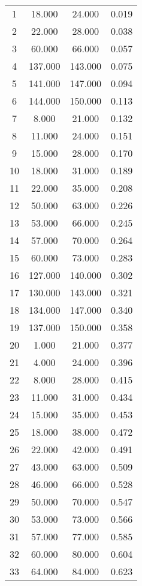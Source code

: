 % 
\begin{tabular}{cccc}
  \hline
  \hline
1 & 18.000 & 24.000 & 0.019 \\ 
  2 & 22.000 & 28.000 & 0.038 \\ 
  3 & 60.000 & 66.000 & 0.057 \\ 
  4 & 137.000 & 143.000 & 0.075 \\ 
  5 & 141.000 & 147.000 & 0.094 \\ 
  6 & 144.000 & 150.000 & 0.113 \\ 
  7 & 8.000 & 21.000 & 0.132 \\ 
  8 & 11.000 & 24.000 & 0.151 \\ 
  9 & 15.000 & 28.000 & 0.170 \\ 
  10 & 18.000 & 31.000 & 0.189 \\ 
  11 & 22.000 & 35.000 & 0.208 \\ 
  12 & 50.000 & 63.000 & 0.226 \\ 
  13 & 53.000 & 66.000 & 0.245 \\ 
  14 & 57.000 & 70.000 & 0.264 \\ 
  15 & 60.000 & 73.000 & 0.283 \\ 
  16 & 127.000 & 140.000 & 0.302 \\ 
  17 & 130.000 & 143.000 & 0.321 \\ 
  18 & 134.000 & 147.000 & 0.340 \\ 
  19 & 137.000 & 150.000 & 0.358 \\ 
  20 & 1.000 & 21.000 & 0.377 \\ 
  21 & 4.000 & 24.000 & 0.396 \\ 
  22 & 8.000 & 28.000 & 0.415 \\ 
  23 & 11.000 & 31.000 & 0.434 \\ 
  24 & 15.000 & 35.000 & 0.453 \\ 
  25 & 18.000 & 38.000 & 0.472 \\ 
  26 & 22.000 & 42.000 & 0.491 \\ 
  27 & 43.000 & 63.000 & 0.509 \\ 
  28 & 46.000 & 66.000 & 0.528 \\ 
  29 & 50.000 & 70.000 & 0.547 \\ 
  30 & 53.000 & 73.000 & 0.566 \\ 
  31 & 57.000 & 77.000 & 0.585 \\ 
  32 & 60.000 & 80.000 & 0.604 \\ 
  33 & 64.000 & 84.000 & 0.623 \\ 

\end{tabular}

